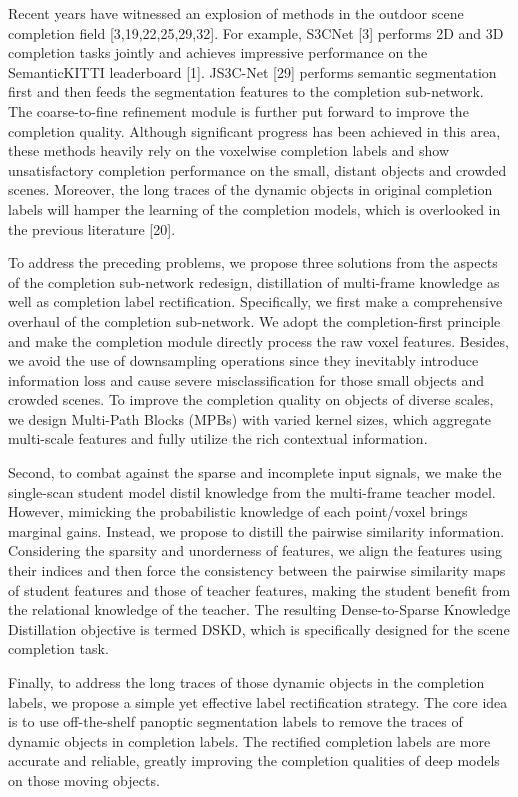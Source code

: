 \documentclass[10pt,twocolumn,letterpaper]{article}
\begin{document}
Recent years have witnessed an explosion of methods in the outdoor scene completion field [3,19,22,25,29,32]. For example, S3CNet [3] performs 2D and 3D completion tasks jointly and achieves impressive performance on the SemanticKITTI leaderboard [1]. JS3C-Net [29] performs semantic segmentation first and then feeds the segmentation features to the completion sub-network. The coarse-to-fine refinement module is further put forward to improve the completion quality. Although significant progress has been achieved in this area, these methods heavily rely on the voxelwise completion labels and show unsatisfactory completion performance on the small, distant objects and crowded scenes. Moreover, the long traces of the dynamic objects in original completion labels will hamper the learning of the completion models, which is overlooked in the previous literature [20].

To address the preceding problems, we propose three solutions from the aspects of the completion sub-network redesign, distillation of multi-frame knowledge as well as completion label rectification. Specifically, we first make a comprehensive overhaul of the completion sub-network. We adopt the completion-first principle and make the completion module directly process the raw voxel features. Besides, we avoid the use of downsampling operations since they inevitably introduce information loss and cause severe misclassification for those small objects and crowded scenes. To improve the completion quality on objects of diverse scales, we design Multi-Path Blocks (MPBs) with varied kernel sizes, which aggregate multi-scale features and fully utilize the rich contextual information.

Second, to combat against the sparse and incomplete input signals, we make the single-scan student model distil knowledge from the multi-frame teacher model. However, mimicking the probabilistic knowledge of each point/voxel brings marginal gains. Instead, we propose to distill the pairwise similarity information. Considering the sparsity and unorderness of features, we align the features using their indices and then force the consistency between the pairwise similarity maps of student features and those of teacher features, making the student benefit from the relational knowledge of the teacher. The resulting Dense-to-Sparse Knowledge Distillation objective is termed DSKD, which is specifically designed for the scene completion task.

Finally, to address the long traces of those dynamic objects in the completion labels, we propose a simple yet effective label rectification strategy. The core idea is to use off-the-shelf panoptic segmentation labels to remove the traces of dynamic objects in completion labels. The rectified completion labels are more accurate and reliable, greatly improving the completion qualities of deep models on those moving objects.
\end{document}
